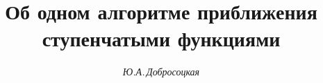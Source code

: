 










\newcommand{\supp}{\operatorname{supp}}


\newcommand{\Var}{\operatorname{Var}}


\newcommand{\Lip}{\operatorname{Lip}}


\newcommand{\opt}{\operatorname{opt}}


\newcommand{\PR}{\operatorname{Pr}}


\newcommand{\Lotr}{L_2[0,1]}


\newcommand{\tts}[1]{}










\setcounter{page}{28}















\author{\it Ю.А.\,Добросоцкая}




\title{Об одном алгоритме приближения\\ ступенчатыми функциями}





\date{}




\pagestyle{plain} %





